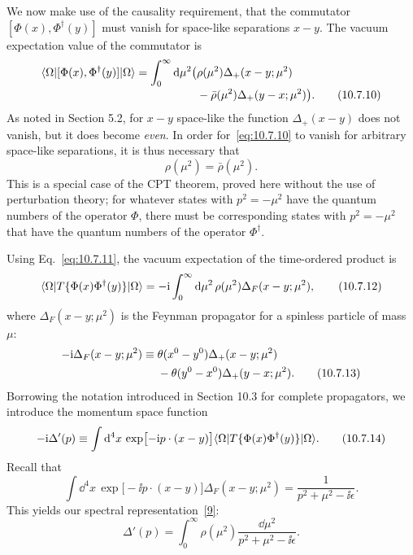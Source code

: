We now make use of the causality requirement, that the commutator
$[\Phi(x),\Phi^\dagger(y)]$ must vanish for space-like separations $x-y$.
The vacuum expectation value of the commutator is
\begin{align}
  \langle \Omega\rvert[\Phi(x),\Phi^\dagger(y)]\lvert \Omega\rangle
  =\int_0^\infty \mathop{}\!\mathrm{d}\mu^2\bigl(&\rho(\mu^2)\Delta_+(x-y;\mu^2)
  \notag\\[-2pt]
  &{}-\bar\rho(\mu^2)\Delta_+(y-x;\mu^2)\bigr).
  \tag{10.7.10}\label{eq:10.7.10}
\end{align}
As noted in Section 5.2, for $x-y$ space-like the function
$\Delta_+(x-y)$ does not vanish, but it does become \emph{even}. In order
for~\eqref{eq:10.7.10} to vanish for arbitrary space-like separations, it is
thus necessary that
\begin{equation}
  \rho(\mu^2)=\bar\rho(\mu^2).
  \tag{10.7.11}\label{eq:10.7.11}
\end{equation}
This is a special case of the CPT theorem, proved here without the use of
perturbation theory; for whatever states with $p^2=-\mu^2$ have the quantum
numbers of the operator $\Phi$, there must be corresponding states with
$p^2=-\mu^2$ that have the quantum numbers of the operator $\Phi^\dagger$.

Using Eq.~\eqref{eq:10.7.11}, the vacuum expectation of the time-ordered
product is
\begin{equation}
  \langle \Omega\rvert T\{\Phi(x)\Phi^\dagger(y)\}\lvert \Omega\rangle
  =-\mathrm{i}\int_0^\infty \mathop{}\!\mathrm{d}\mu^2\,\rho(\mu^2)\Delta_F(x-y;\mu^2),
  \tag{10.7.12}\label{eq:10.7.12}
\end{equation}
where $\Delta_F(x-y;\mu^2)$ is the Feynman propagator for a spinless
particle of mass $\mu$:
\begin{align}
  -\mathrm{i}\Delta_F(x-y;\mu^2)\equiv{}&
  \theta(x^0-y^0)\Delta_+(x-y;\mu^2)\notag\\
  &{}-\theta(y^0-x^0)\Delta_+(y-x;\mu^2).
  \tag{10.7.13}\label{eq:10.7.13}
\end{align}
Borrowing the notation introduced in Section 10.3 for complete propagators,
we introduce the momentum space function
\begin{equation}
  -\mathrm{i}\Delta'(p)\equiv\int \mathop{}\!\mathrm{d}^4x\,\exp\bigl[-\mathrm{i} p\cdot(x-y)\bigr]
  \langle \Omega\rvert T\{\Phi(x)\Phi^\dagger(y)\}\lvert \Omega\rangle.
  \tag{10.7.14}\label{eq:10.7.14}
\end{equation}
Recall that
\begin{equation}
  \int \dd^4x\,\exp\bigl[-\ii p\cdot(x-y)\bigr]\Delta_F(x-y;\mu^2)
  =\frac{1}{p^2+\mu^2-\ii\epsilon}.
  \tag{10.7.15}\label{eq:10.7.15}
\end{equation}
This yields our spectral representation~\hyperref[ref:10.9]{[9]}:
\begin{equation}
  \Delta'(p)=\int_0^\infty\rho(\mu^2)
  \frac{\dd\mu^2}{p^2+\mu^2-\ii\epsilon}.
  \tag{10.7.16}\label{eq:10.7.16}
\end{equation}

